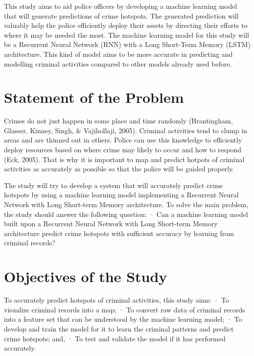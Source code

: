     This study aims to aid police officers by developing a machine learning model that will generate predictions of crime hotspots. The generated prediction will valuably help the police efficiently deploy their assets by directing their efforts to where it may be needed the most. The machine learning model for this study will be a Recurrent Neural Network (RNN) with a Long Short-Term Memory (LSTM) architecture. This kind of model aims to be more accurate in predicting and modelling criminal activities compared to other models already used before.

\section{Statement of the Problem} %

    Crimes do not just happen in some place and time randomly (Brantingham, Glasser, Kinney, Singh, \& Vajihollaji, 2005). Criminal activities tend to clump in areas and are thinned out in others. Police can use this knowledge to efficiently deploy resources based on where crime may likely to occur and how to respond (Eck, 2005). That is why it is important to map and predict hotpots of criminal activities as accurately as possible so that the police will be guided properly.

    The study will try to develop a system that will accurately predict crime hotspots by using a machine learning model implementing a Recurrent Neural Network with Long Short-term Memory architecture. To solve the main problem, the study should answer the following question:
        ·  Can a machine learning model built upon a Recurrent Neural Network with Long Short-term Memory architecture predict crime hotspots with sufficient accuracy by learning from criminal records?

\section{Objectives of the Study} %

To accurately predict hotspots of criminal activities, this study aims:
·         To visualize criminal records into a map;
·         To convert raw data of criminal records into a feature set that can be understood by the machine learning model;
·         To develop and train the model for it to learn the criminal patterns and predict crime hotspots; and,
·         To test and validate the model if it has performed accurately.

